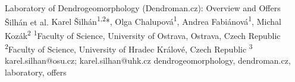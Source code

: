 {
}

\abstract
{Laboratory of Dendrogeomorphology (Dendroman.cz): Overview and Offers} 
{Šilhán et al.} 
{Karel Šilhán\textsuperscript{1,2}*, Olga Chalupová\textsuperscript{1}, Andrea Fabiánová\textsuperscript{1}, Michal Kozák\textsuperscript{2}} 
{\POtag} 
{
	\textsuperscript{1}Faculty of Science, University of Ostrava, Ostrava, Czech Republic
	\textsuperscript{2}Faculty of Science, University of Hradec Králové, Czech Republic
	\textsuperscript{3}
}
{karel.silhan@osu.cz; karel.silhan@uhk.cz}  %
{dendrogeomorphology, dendroman.cz, laboratory, offers}

